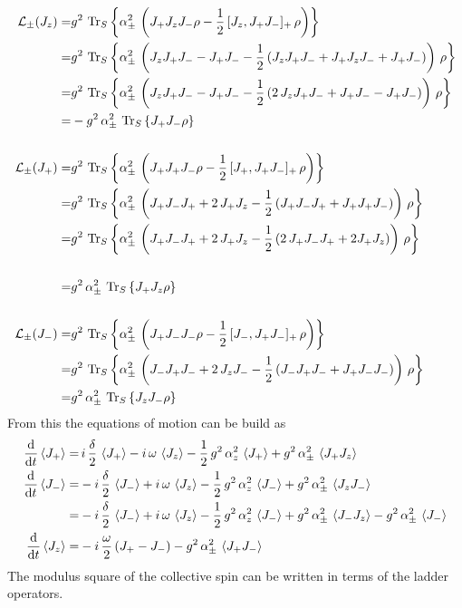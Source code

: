 \documentclass{article}
\begin{document}
\begin{align*}
    \mathcal{L}_\pm(J_z)=&g^2\,\operatorname{Tr}_S\left\{\alpha_\pm^2\,\left(J_+ J_z J_- \rho-\frac{1}{2}\,[J_z,J_+ J_-]_+\,\rho\right)\right\}\\
    =&g^2\,\operatorname{Tr}_S\left\{\alpha_\pm^2\,\left(J_z J_+ J_- - J_+ J_- -\frac{1}{2}\,(J_z J_+ J_- + J_+ J_z J_- + J_+ J_-)\right)\,\rho\right\}\\
    =&g^2\,\operatorname{Tr}_S\left\{\alpha_\pm^2\,\left(J_z J_+ J_- - J_+ J_- -\frac{1}{2}\,(2\,J_z J_+ J_- + J_+ J_- - J_+ J_-)\right)\,\rho\right\}\\
    =&-g^2\,\alpha_\pm^2\,\operatorname{Tr}_S\left\{J_+ J_- \rho\right\}\\\\
    \mathcal{L}_\pm(J_+)=&g^2\,\operatorname{Tr}_S\left\{\alpha_\pm^2\,\left(J_+ J_+ J_- \rho-\frac{1}{2}\,[J_+,J_+ J_-]_+\,\rho\right)\right\}\\
    =&g^2\,\operatorname{Tr}_S\left\{\alpha_\pm^2\,\left(J_+ J_- J_+ + 2\,J_+ J_z -\frac{1}{2}\,(J_+ J_- J_+ + J_+ J_+ J_-)\right)\,\rho\right\}\\ =&g^2\,\operatorname{Tr}_S\left\{\alpha_\pm^2\,\left(J_+ J_- J_+ + 2\,J_+ J_z -\frac{1}{2}\,(2\,J_+ J_- J_+ + 2 J_+ J_z)\right)\,\rho\right\}\\\\
    =&g^2\,\alpha_\pm^2\,\operatorname{Tr}_S\left\{J_+ J_z \rho\right\}\\\\
    \mathcal{L}_\pm(J_-)=&g^2\,\operatorname{Tr}_S\left\{\alpha_\pm^2\,\left(J_+ J_- J_- \rho-\frac{1}{2}\,[J_-,J_+ J_-]_+\,\rho\right)\right\}\\
    =&g^2\,\operatorname{Tr}_S\left\{\alpha_\pm^2\,\left(J_- J_+ J_- + 2\,J_z J_- -\frac{1}{2}\,(J_- J_+ J_- + J_+ J_- J_-)\right)\,\rho\right\}\\ 
    =&g^2\,\alpha_\pm^2\,\operatorname{Tr}_S\left\{J_z J_- \rho\right\}
\end{align*}
From this the equations of motion can be build as
\begin{align*}
    \frac{\text{d}}{\text{d}t} \braket{J_+}=&\,i\,\frac{\delta}{2}\,\braket{J_+}-i\,\omega\,\braket{J_z}-\frac{1}{2}\,g^2\,\alpha_z^2\,\braket{J_+}+g^2\,\alpha_\pm^2\,\braket{J_+ J_z}\\
    \frac{\text{d}}{\text{d}t} \braket{J_-}=&-i\,\frac{\delta}{2}\,\braket{J_-}+i\,\omega\,\braket{J_z}-\frac{1}{2}\,g^2\,\alpha_z^2\,\braket{J_-}+g^2\,\alpha_\pm^2\,\braket{J_z J_-}\\
    =&-i\,\frac{\delta}{2}\,\braket{J_-}+i\,\omega\,\braket{J_z}-\frac{1}{2}\,g^2\,\alpha_z^2\,\braket{J_-}+g^2\,\alpha_\pm^2\,\braket{J_- J_z}-g^2\,\alpha_\pm^2\,\braket{J_-}\\
    \frac{\text{d}}{\text{d}t} \braket{J_z}=&-i\,\frac{\omega}{2}\,(J_+ - J_-) - g^2\,\alpha_\pm^2\,\braket{J_+ J_-}    
\end{align*}
The modulus square of the collective spin can be written in terms of the ladder operators.
\end{document}

